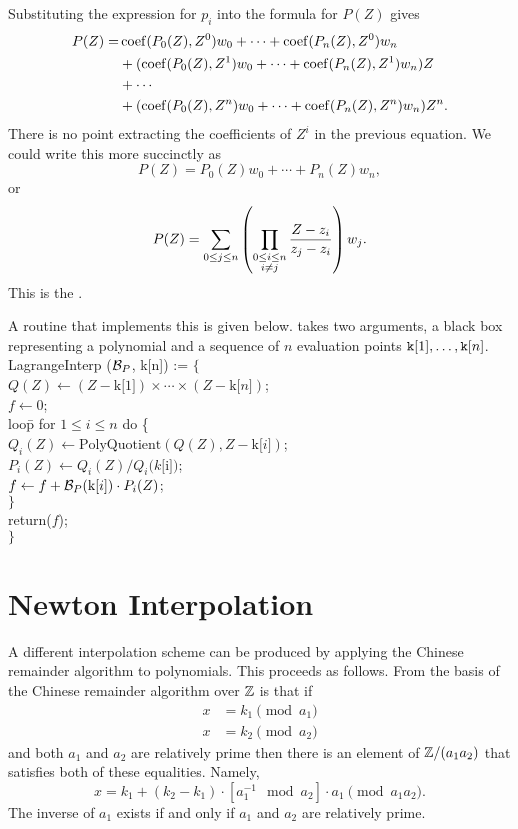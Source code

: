 Substituting the expression for $p_i$ into the formula for $P(Z)$
gives
\[
\begin{aligned}
P(Z) = &\operatorname{coef}(P_0(Z), Z^{0}) w_0 + \cdots + \operatorname{coef}(P_n(Z), Z^{0}) w_n \\
 & + (\operatorname{coef}(P_0(Z), Z^{1}) w_0 + \cdots + \operatorname{coef}(P_n(Z), Z^{1}) w_n) Z \\
 & + \cdots \\
 & + (\operatorname{coef}(P_0(Z), Z^{n}) w_0 + \cdots + \operatorname{coef}(P_n(Z), Z^{n}) w_n) Z^n.
\end{aligned}
\]
There is no point extracting the coefficients
of $Z^i$ in the previous equation.  We could write this more succinctly
as
\[
P(Z) = P_0(Z) w_0 + \cdots + P_n(Z) w_n,
\]
or
\[
P(Z) = \sum_{0\le j\le n} \left({\prod_{\substack{0\le i\le n \\ i\not=j}}
{Z - z_i \over z_j - z_i}}\right) w_j.
\]
This is the .

A routine that implements this is given below.
 takes two arguments, a black box representing a
polynomial and a sequence of $n$ evaluation points ${\tt k}[1], \ldots,
{\tt k}[n]$.
\begindsacode
LagrangeInterp (${\cal B}_P$, k[n]) := $\{$ \\
\> $Q(Z) \leftarrow   (Z - \mbox{k[$1$]})\times \cdots \times (Z - \mbox{k[$n$]})$; \\
\> $f \leftarrow 0$; \\
\> loo\=p for $1 \le i \le n$ do \{ \\
\>\> $Q_i(Z) \leftarrow \mbox{PolyQuotient}(Q(Z), Z - \mbox{k[$i$]})$; \\
\>\> $P_i(Z) \leftarrow Q_i(Z)/Q_i(k[$i$])$; \\
\>\> $f \leftarrow f + {\cal B}_P(\mbox{k[$i$]}) \cdot P_i(Z)$; \\
\>\> $\}$ \\
\> return($f$); \\
\> $\}$
\enddsacode

\section{Newton Interpolation}
\label{Interp:CRA:Sec}

A different interpolation scheme can be produced by applying the
Chinese remainder algorithm to
polynomials.  This proceeds as follows.  From
 the basis of the Chinese 
remainder algorithm over $\mathbb{Z}$ is that if
\[
\begin{aligned}
  x &= k_1 \pmod{a_1}\\
  x &= k_2 \pmod{a_2}
\end{aligned}
\]
and both $a_1$ and $a_2$ are relatively prime then there is an element of 
$\mathbb{Z}/(a_1 a_2)$ that satisfies both of these equalities.  Namely,
\begin{equation}
x = k_1 +  (k_2 - k_1) \cdot \left[a_1^{-1} \mod{a_2}\right]\cdot a_1 
   \pmod {a_1 a_2}.
\label{Chinese:Remainder:Alg:Eq}
\end{equation}
The inverse of $a_1$ exists if and only if $a_1$
and $a_2$ are relatively prime. 

